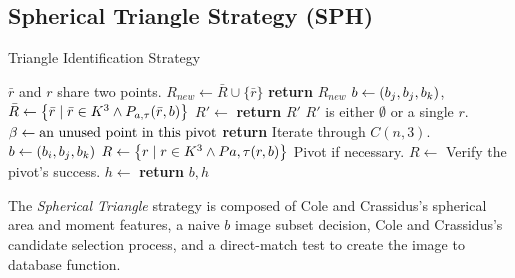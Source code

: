 \subsection{Spherical Triangle Strategy (SPH)}\label{subsec:sphericalTriangleMethod}
\begin{algorithm}
    \caption{Triangle Identification Strategy} \label{algorithm:triangleIdentification}
    \begin{algorithmic}[1]
        \LineComment $\bar{r}$ and $r$ share two points.
        \State $R_{new} \gets \bar{R} \cup \{\bar{r}\}$
        \EndIf
        \EndFor
        \State \textbf{return} $R_{new}$
        \EndFunction
        \State $b \gets (b_j, b_j, b_k)$, $\bar{R} \gets \left\{  \bar{r} \mid \bar{r} \in K^3
        \land P_{a, \tau}(\bar{r}, b)  \right\}$
        \State $R' \gets $ 
        \State \textbf{return} $R'$ \Comment $R'$ is either $\emptyset$ or a single $r$.
        \Else
        \State $\beta \gets \text{an unused point in this pivot}$
        \State \textbf{return} 
        \EndIf
        \EndFunction
          \Comment Iterate through $C(n, 3)$.
        \State $b \gets \left(b_i, b_j, b_k\right)$
        \State $R \gets \left\{  r \mid r \in K^3
        \land P{a, \tau}(r, b)  \right\}$
         \Comment Pivot if necessary.
        \State $R \gets $ 
        \EndIf
         \Comment Verify the pivot's success.
        \State $h \gets $ 
        \invalidBijection
        \State \textbf{return} $b, h$
        \EndIf
        \EndIf
        \EndFor
        \EndFor
        \EndFor
        \EndFunction
    \end{algorithmic}
\end{algorithm}

The \textit{Spherical Triangle} strategy is composed of Cole and Crassidus's spherical area and moment features, a
naive $b$ image subset decision, Cole and Crassidus's candidate selection process, and a direct-match test to create
the image to database function.

